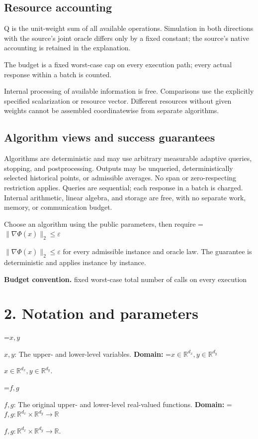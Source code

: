 \documentclass[10pt,a4paper]{article}
\newcommand{\AtlasMath}[1]{\par\begingroup\centering\setbox0=\hbox{$\displaystyle #1$}\ifdim\wd0>1.4\linewidth\typeout{ATLAS WIDE FORMULA: \the\wd0}\fi\ifdim\wd0>\linewidth\resizebox{\linewidth}{!}{\box0}\else\box0\fi\par\endgroup}
\newcommand{\AtlasInlineMath}[1]{\begingroup\setbox0=\hbox{$#1$}\ifdim\wd0>.4\linewidth\endgroup\AtlasMath{#1}\else\endgroup$#1$\fi}
\begin{document}
\subsection{Resource accounting}
Q is the unit-weight sum of all available operations. Simulation in both directions with the source's joint oracle differs only by a fixed constant; the source's native accounting is retained in the explanation.

The budget is a fixed worst-case cap on every execution path; every actual response within a batch is counted.

Internal processing of available information is free. Comparisons use the explicitly specified scalarization or resource vector. Different resources without given weights cannot be assembled coordinatewise from separate algorithms.

\subsection{Algorithm views and success guarantees}
Algorithms are deterministic and may use arbitrary measurable adaptive queries, stopping, and postprocessing. Outputs may be unqueried, deterministically selected historical points, or admissible averages. No span or zero-respecting restriction applies. Queries are sequential; each response in a batch is charged. Internal arithmetic, linear algebra, and storage are free, with no separate work, memory, or communication budget.

Choose an algorithm using the public parameters, then require \AtlasInlineMath{\|\nabla\Phi(\widehat{x})\|_2\le\varepsilon} for every admissible instance and oracle law. The guarantee is deterministic and applies instance by instance.

\textbf{Budget convention.} fixed worst-case total number of calls on every execution

\section{2. Notation and parameters}
\AtlasInlineMath{x,y}: The upper- and lower-level variables. \textbf{Domain:} \AtlasInlineMath{x\in\mathbb R^{d_x},y\in\mathbb R^{d_y}}.

\AtlasInlineMath{f,g}: The original upper- and lower-level real-valued functions. \textbf{Domain:} \AtlasInlineMath{f,g:\mathbb R^{d_x}\times\mathbb R^{d_y}\to\mathbb R}.
\end{document}
